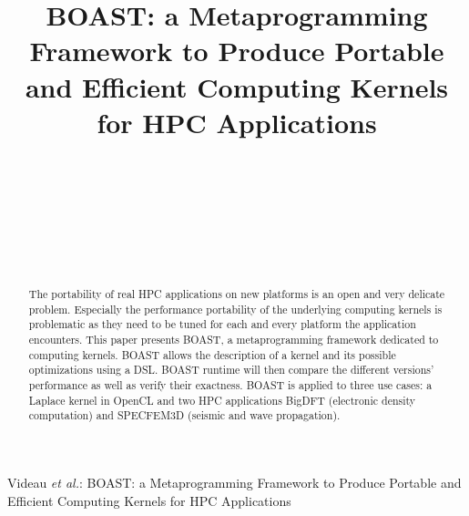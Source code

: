 \documentclass{IEEEtran}
\begin{document}
\title{BOAST: a Metaprogramming Framework to Produce Portable and Efficient Computing Kernels for HPC Applications}

\author{
   \\
   \\
   \\
   \\
   \\
   \\
}

{Videau \MakeLowercase{\textit{et al.}}: BOAST: a Metaprogramming Framework to Produce Portable and Efficient Computing Kernels for HPC Applications}


\maketitle

\begin{abstract}
The portability of real HPC applications on new platforms is an open and very
delicate problem.  Especially the performance portability of the underlying
computing kernels is problematic as they need to be tuned for each and every
platform the application encounters. This paper presents BOAST, a
metaprogramming framework dedicated to computing kernels.  BOAST allows the
description of a kernel and its possible optimizations using a DSL. BOAST
runtime will then compare the different versions' performance as well as verify
their exactness. BOAST is applied to three use cases: a Laplace kernel in
OpenCL and two HPC applications BigDFT (electronic density computation) and
SPECFEM3D (seismic and wave propagation).
\end{abstract}
\end{document}
